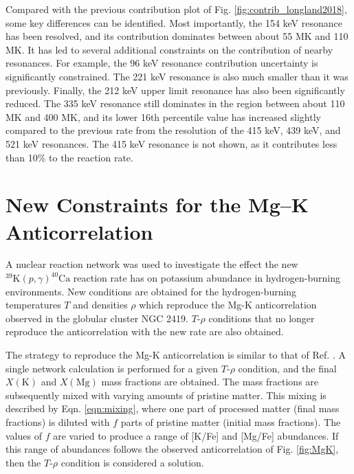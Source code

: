 Compared with the previous contribution plot of Fig. \ref{fig:contrib_longland2018}, some key differences can be identified. Most importantly, the 154 keV resonance has been resolved, and its contribution dominates between about 55 MK and 110 MK. It has led to several additional constraints on the contribution of nearby resonances. For example, the 96 keV resonance contribution uncertainty is significantly constrained. The 221 keV resonance is also much smaller than it was previously. Finally, the 212 keV upper limit resonance has also been significantly reduced. The 335 keV resonance still dominates in the region between about 110 MK and 400 MK, and its lower 16th percentile value has increased slightly compared to the previous rate from the resolution of the 415 keV, 439 keV, and 521 keV resonances. The 415 keV resonance is not shown, as it contributes less than 10$\%$ to the reaction rate.

\section{New Constraints for the Mg--K Anticorrelation}

A nuclear reaction network was used to investigate the effect the new $^{39}\mathrm{K}(p,\gamma)^{40}\mathrm{Ca}$ reaction rate has on potassium abundance in hydrogen-burning environments. New conditions are obtained for the hydrogen-burning temperatures $T$ and densities $\rho$ which reproduce the Mg-K anticorrelation observed in the globular cluster NGC 2419. $T$-$\rho$ conditions that no longer reproduce the anticorrelation with the new rate are also obtained. 

The strategy to reproduce the Mg-K anticorrelation is similar to that of Ref. \cite{Iliadis2016}. A single network calculation is performed for a given $T$-$\rho$ condition, and the final $X(\mathrm{K})$ and $X(\mathrm{Mg})$ mass fractions are obtained. The mass fractions are subsequently mixed with varying amounts of pristine matter. This mixing is described by Eqn. \ref{eqn:mixing}, where one part of processed matter (final mass fractions) is diluted with $f$ parts of pristine matter (initial mass fractions). The values of $f$ are varied to produce a range of [K/Fe] and [Mg/Fe] abundances. If this range of abundances follows the observed anticorrelation of Fig. \ref{fig:MgK}, then the $T$-$\rho$ condition is considered a solution.

